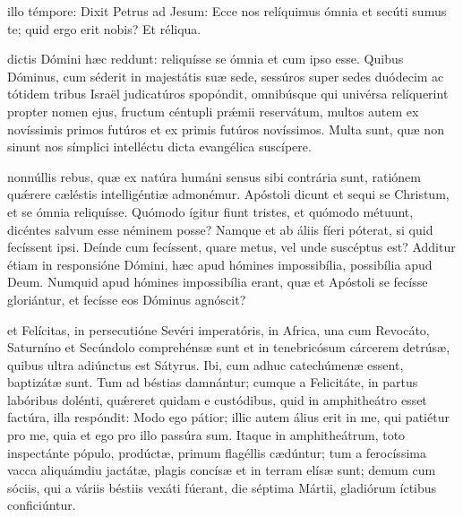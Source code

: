 \documentclass[fontsize=9pt,paper=A6,twoside,BCOR=1mm,DIV=22,headinclude]{scrarticle}
\begin{document}
\begin{multicols}{2}
{\RVCvi 

 illo témpore: Dixit Petrus ad Jesum: Ecce nos relíquimus ómnia et secúti sumus te; quid ergo erit nobis? Et réliqua.

 dictis Dómini hæc reddunt: reliquísse se ómnia et cum ipso esse. Quibus Dóminus, cum séderit in majestátis suæ sede, sessúros super sedes duódecim ac tótidem tribus Israël judicatúros spopóndit, omnibúsque qui univérsa relíquerint propter nomen ejus, fructum céntupli pr\'æmii reservátum, multos autem ex novíssimis primos futúros et ex primis futúros novíssimos. Multa sunt, quæ non sinunt nos símplici intelléctu dicta evangélica suscípere.

\RVCvii 

 nonnúllis rebus, quæ ex natúra humáni sensus sibi contrária sunt, ratiónem qu\'ærere cæléstis intelligéntiæ admonémur. Apóstoli dicunt et sequi se Christum, et se ómnia reliquísse. Quómodo ígitur fiunt tristes, et quómodo métuunt, dicéntes salvum esse néminem posse? Namque et ab áliis fíeri póterat, si quid fecíssent ipsi. Deínde cum fecíssent, quare metus, vel unde suscéptus est? Additur étiam in responsióne Dómini, hæc apud hómines impossibília, possibília apud Deum. Numquid apud hómines impossibília erant, quæ et Apóstoli se fecísse gloriántur, et fecísse eos Dóminus agnóscit?

}

\RVCviii 



 et Felícitas, in persecutióne Sevéri imperatóris, in Africa, una cum Revocáto, Saturníno et Secúndolo comprehénsæ sunt et in tenebricósum cárcerem detrúsæ, quibus ultra adiúnctus est Sátyrus. Ibi, cum adhuc catechúmenæ essent, baptizátæ sunt. Tum ad béstias damnántur; cumque a Felicitáte, in partus labóribus dolénti, quǽreret quidam e custódibus, quid in amphitheátro esset factúra, illa respóndit: Modo ego pátior; illic autem álius erit in me, qui patiétur pro me, quia et ego pro illo passúra sum. Itaque in amphitheátrum, toto inspectánte pópulo, prodúctæ, primum flagéllis cædúntur; tum a ferocíssima vacca aliquámdiu jactátæ, plagis concísæ et in terram elísæ sunt; demum cum sóciis, qui a váriis béstiis vexáti fúerant, die séptima Mártii, gladiórum íctibus conficiúntur.


\end{multicols}
\end{document}
